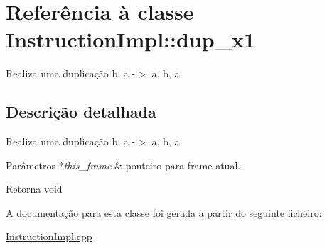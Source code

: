 \hypertarget{class_instruction_impl_1_1dup__x1}{}\section{Referência à classe Instruction\+Impl\+:\+:dup\+\_\+x1}
\label{class_instruction_impl_1_1dup__x1}


Realiza uma duplicação b, a -\/$>$ a, b, a.  




\subsection{Descrição detalhada}
Realiza uma duplicação b, a -\/$>$ a, b, a. 


\begin{DoxyParams}{Parâmetros}
{\em $\ast$this\+\_\+frame} & ponteiro para frame atual. \\
\hline
\end{DoxyParams}
\begin{DoxyReturn}{Retorna}
void 
\end{DoxyReturn}


A documentação para esta classe foi gerada a partir do seguinte ficheiro\+:\begin{DoxyCompactItemize}
\item 
\hyperlink{_instruction_impl_8cpp}{Instruction\+Impl.\+cpp}\end{DoxyCompactItemize}
